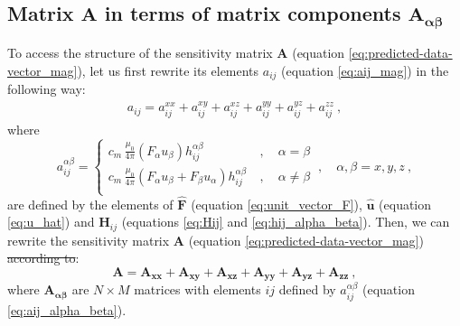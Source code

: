 \documentclass[manuscript]{geophysics}
\providecommand{\DIFaddtex}[1]{{\protect\color{blue}\uwave{#1}}} %
\providecommand{\DIFdeltex}[1]{{\protect\color{red}\sout{#1}}}                      %
\providecommand{\DIFaddbegin}{} %
\providecommand{\DIFaddend}{} %
\providecommand{\DIFdelbegin}{} %
\providecommand{\DIFdelend}{} %
\providecommand{\DIFadd}[1]{\texorpdfstring{\DIFaddtex{#1}}{#1}} %
\providecommand{\DIFdel}[1]{\texorpdfstring{\DIFdeltex{#1}}{}} %
\begin{document}
\subsection{Matrix $\mathbf{A}$ in terms of matrix components $\mathbf{A_{\boldsymbol{\alpha\beta}}}$}

To access the structure of the sensitivity matrix $\mathbf{A}$ 
(equation \ref{eq:predicted-data-vector_mag}), let us first rewrite its elements 
$a_{ij}$ (equation \ref{eq:aij_mag}) in the following way:
\begin{equation}
	\begin{split}
		a_{ij} = a^{xx}_{ij} + a^{xy}_{ij} + a^{xz}_{ij} + a^{yy}_{ij} + a^{yz}_{ij} + a^{zz}_{ij} \: ,
	\end{split}
	\label{eq:aij_mag_expand}
\end{equation}
where
\begin{equation}
	a^{\alpha\beta}_{ij} = 
	\begin{cases}
		c_{m} \, \frac{\mu_{0}}{4\pi} 
		\left( F_{\alpha} u_{\beta} \right) h^{\alpha\beta}_{ij} \: &, \quad \alpha = \beta \\
		c_{m} \, \frac{\mu_{0}}{4\pi} 
		\left( F_{\alpha} u_{\beta} + F_{\beta} u_{\alpha} \right) h^{\alpha\beta}_{ij} \: &, \quad \alpha \ne \beta \\
	\end{cases}
	\: , \quad \alpha, \beta = x, y, z \: ,
	\label{eq:aij_alpha_beta}
\end{equation}
are defined by the elements of $\hat{\mathbf{F}}$ 
(equation \ref{eq:unit_vector_F}), $\hat{\mathbf{u}}$ (equation \ref{eq:u_hat}) and 
$\mathbf{H}_{ij}$ (equations \ref{eq:Hij} and \ref{eq:hij_alpha_beta}).
Then, we can rewrite the sensitivity matrix $\mathbf{A}$ 
(equation \ref{eq:predicted-data-vector_mag}) \DIFdelbegin \DIFdel{according to}\DIFdelend \DIFaddbegin \DIFadd{as}\DIFaddend :
\begin{equation}
	\mathbf{A} = \mathbf{A_{xx}} + \mathbf{A_{xy}} + \mathbf{A_{xz}} + 
	\mathbf{A_{yy}} + \mathbf{A_{yz}} + \mathbf{A_{zz}} \: ,
	\label{eq:A_expand}
\end{equation}
where $\mathbf{A_{\boldsymbol{\alpha\beta}}}$ are $N \times M$ matrices with elements 
$ij$ defined by $a^{\alpha\beta}_{ij}$ (equation \ref{eq:aij_alpha_beta}).
\end{document}
